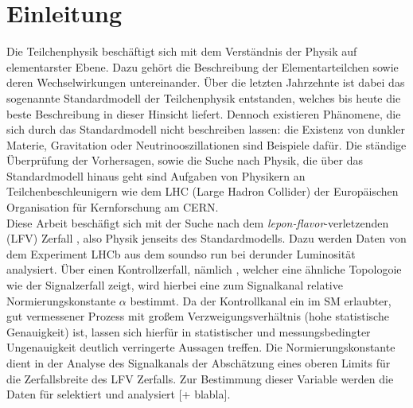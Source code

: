 \chapter{Einleitung}

Die Teilchenphysik beschäftigt sich mit dem Verständnis der Physik auf elementarster Ebene. Dazu gehört die Beschreibung der Elementarteilchen sowie deren Wechselwirkungen untereinander. Über die letzten Jahrzehnte ist dabei das sogenannte Standardmodell der Teilchenphysik entstanden, welches bis heute die beste Beschreibung in dieser Hinsicht liefert. Dennoch existieren Phänomene, die sich durch das Standardmodell nicht beschreiben lassen: die Existenz von dunkler Materie, Gravitation oder Neutrinooszillationen sind Beispiele dafür. Die ständige Überprüfung der Vorhersagen, sowie die Suche nach Physik, die über das Standardmodell hinaus geht sind Aufgaben von Physikern an Teilchenbeschleunigern wie dem LHC (Large Hadron Collider) der Europäischen Organisation für Kernforschung am CERN. \\
Diese Arbeit beschäfigt sich mit der Suche nach dem \textit{lepon-flavor}-verletzenden (LFV) Zerfall \signal, also Physik jenseits des Standardmodells.
Dazu werden Daten von dem Experiment LHCb aus dem soundso run bei derunder Luminosität analysiert. Über einen Kontrollzerfall, nämlich \kontroll, welcher eine ähnliche Topologoie wie der Signalzerfall zeigt, wird hierbei eine zum Signalkanal relative Normierungskonstante $\alpha$ bestimmt. Da der Kontrollkanal ein im SM erlaubter, gut vermessener Prozess mit großem Verzweigungsverhältnis (hohe statistische Genauigkeit) ist, lassen sich hierfür in statistischer und messungsbedingter Ungenauigkeit deutlich verringerte Aussagen treffen. Die Normierungskonstante dient in der Analyse des Signalkanals der Abschätzung eines oberen Limits für die Zerfallsbreite des LFV Zerfalls. Zur Bestimmung dieser Variable werden die Daten für \kontroll selektiert und analysiert [+ blabla]. \cite{ba-maik}
